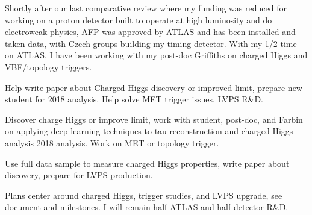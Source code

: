 Shortly after our last comparative review where my funding was reduced for working on a proton detector built to operate at high luminosity and do electroweak physics, AFP was approved by ATLAS and has been installed and taken data, with Czech groups building my timing detector.  With my 1/2 time on ATLAS, I have been working with my post-doc Griffiths on charged Higgs and VBF/topology triggers.

\vspace*{0.1in}
\begin{description}
\item[2017] Help write paper about Charged Higgs discovery or improved 
limit, prepare new student for 2018 analysis. Help solve MET trigger issues, LVPS R\&D.
\item[2018] Discover charge Higgs or improve limit,  work with student, post-doc, and Farbin on applying deep learning techniques to tau reconstruction and charged Higgs analysis 2018 analysis. Work on MET or topology trigger.
\item[2019] Use full data sample to measure charged Higgs properties, write paper about discovery,  prepare for LVPS production. 
\end{description}
\vspace*{0.1in}
 Plans center around charged Higgs, trigger studies, and LVPS upgrade, see document and milestones.  I will remain half ATLAS and half detector R\&D. 